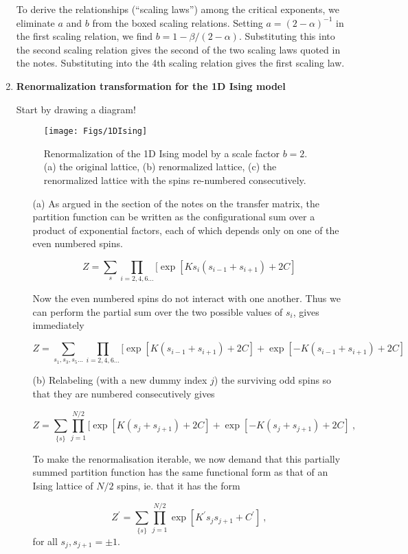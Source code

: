 \documentclass[a4paper,12pt,twoside]{article}
\begin{document}
\begin{enumerate}
To derive the relationships (``scaling laws'') among the critical exponents, we eliminate $a$ and $b$ from the boxed scaling relations. 
Setting $a=(2-\alpha)^{-1}$ in the first scaling relation, we
find $b=1-\beta/(2-\alpha)$. Substituting this into the second scaling
relation gives the second of the two scaling laws quoted in the notes. Substituting
into the 4th scaling relation gives the first scaling law.
\item {\bf Renormalization transformation for the 1D Ising model}

Start by drawing a diagram!

\begin{figure}[h]
\centerline{\texttt{[image: Figs/1DIsing]}}
\caption{Renormalization of the 1D Ising model by a scale factor $b=2$.
(a) the original lattice, (b) renormalized lattice, (c) the
renormalized lattice with the spins re-numbered consecutively.}
\end{figure}

\begin{itemize}

\item[(a)] As argued in the section of the notes on the transfer
matrix, the partition function can be written as the configurational
sum over a product of exponential factors, each of which depends only
on one of the even numbered spins.

\[
Z=\sum_{s}\prod_{i=2,4,6...} [\exp [Ks_i(s_{i-1}+s_{i+1})+2C]
\]

Now the even numbered spins do not interact with one another. Thus we
can perform the partial sum over the two possible values of $s_i$,
gives immediately

\[
Z=\sum_{s_1,s_3,s_5...}\prod_{i=2,4,6...} [\exp
[K(s_{i-1}+s_{i+1})+2C] + \exp[-K(s_{i-1}+s_{i+1})+2C]
\]

\item[(b)] Relabeling (with a new dummy index $j$) the surviving odd spins so that they are numbered
consecutively gives

\[
Z=\sum_{\{s\}}\prod_{j=1}^{N/2}[\exp [K(s_j+s_{j+1})+2C] + \exp[-K(s_j+s_{j+1})+2C]\:,
\]

To make the renormalisation iterable, we now demand that this partially
summed partition function has the same functional form as that of an
Ising lattice of $N/2$ spins, ie. that it has the form

\[
Z^\prime=\sum_{\{s\}}\prod_{j=1}^{N/2}\exp[K^\prime s_js_{j+1}+C^\prime]\:,
\]
for all $s_j,s_{j+1}=\pm 1$.


\end{itemize}
\end{enumerate}
\end{document}
